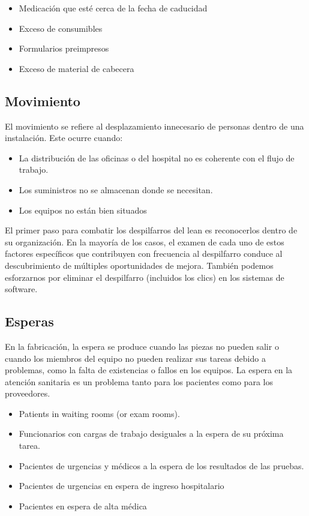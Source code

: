 \begin{itemize}
    \item Medicación que esté cerca de la fecha de caducidad
    \item Exceso de consumibles
    \item Formularios preimpresos
    \item Exceso de material de cabecera
\end{itemize}

\subsection{Movimiento}

El movimiento se refiere al desplazamiento innecesario de personas dentro de una instalación. Este ocurre cuando:

\begin{itemize}
    \item La distribución de las oficinas o del hospital no es coherente con el flujo de trabajo.
    \item Los suministros no se almacenan donde se necesitan.
    \item Los equipos no están bien situados
\end{itemize}

El primer paso para combatir los despilfarros del lean es reconocerlos dentro de su organización. En la mayoría de los casos, el examen de cada uno de estos factores específicos que contribuyen con frecuencia al despilfarro conduce al descubrimiento de múltiples oportunidades de mejora. También podemos esforzarnos por eliminar el despilfarro (incluidos los clics) en los sistemas de software.

\subsection{Esperas}

En la fabricación, la espera se produce cuando las piezas no pueden salir o cuando los miembros del equipo no pueden realizar sus tareas debido a problemas, como la falta de existencias o fallos en los equipos. La espera en la atención sanitaria es un problema tanto para los pacientes como para los proveedores.

\begin{itemize}
    \item Patients in waiting rooms (or exam rooms).
    \item Funcionarios con cargas de trabajo desiguales a la espera de su próxima tarea.
    \item Pacientes de urgencias y médicos a la espera de los resultados de las pruebas.
    \item Pacientes de urgencias en espera de ingreso hospitalario
    \item Pacientes en espera de alta médica
\end{itemize}

